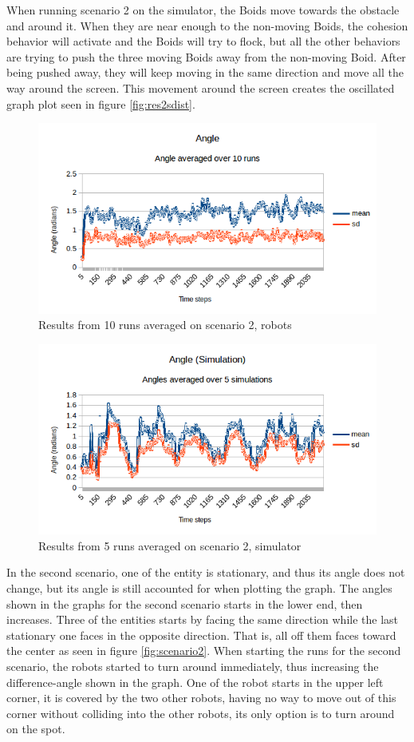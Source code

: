 When running scenario 2 on the simulator, the Boids move towards the obstacle and around it. When they are near enough to the non-moving Boids, the cohesion behavior will activate and the Boids will try to flock, but all the other behaviors are trying to push the three moving Boids away from the non-moving Boid. After being pushed away, they will keep moving in the same direction and move all the way around the screen. This movement around the screen creates the oscillated graph plot seen in figure \ref{fig:res2sdist}.

\begin{figure}[h]
\begin{center}
\includegraphics[width=0.8\linewidth]{figs/runs/2pangle}
\end{center}
\caption[2. Angle, robots]{Results from 10 runs averaged on scenario 2, robots}
\label{fig:res2pang}
\end{figure}
\begin{figure}[h]
\begin{center}
\includegraphics[width=0.8\linewidth]{figs/runs/2sangle}
\end{center}
\caption[2. Angles, robots]{Results from 5 runs averaged on scenario 2, simulator}
\label{fig:res2sang}
\end{figure}
In the second scenario, one of the entity is stationary, and thus its angle does not change, but its angle is still accounted for when plotting the graph. The angles shown in the graphs for the second scenario starts in the lower end, then increases.
Three of the entities starts by facing the same direction while the last stationary one faces in the opposite direction. That is, all off them faces toward the center as seen in figure \ref{fig:scenario2}.
When starting the runs for the second scenario, the robots started to turn around immediately, thus increasing the difference-angle shown in the graph. One of the robot starts in the upper left corner, it is covered by the two other robots, having no way to move out of this corner without colliding into the other robots, its only option is to turn around on the spot.


